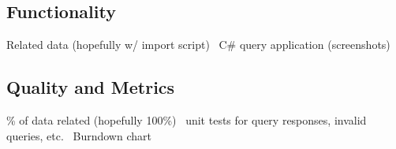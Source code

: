 \documentclass[paper=a4]{article}
\begin{document}
\subsection{Functionality}
Related data (hopefully w/ import script) \
C\# query application (screenshots) \

\subsection{Quality and Metrics}
\% of data related (hopefully 100\%) \
unit tests for query responses, invalid queries, etc. \
Burndown chart

\end{document}
